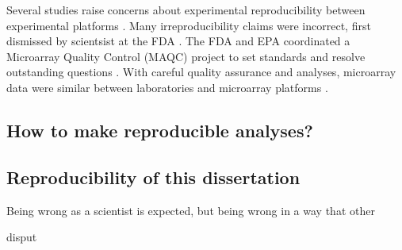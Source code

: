 Several studies 
raise concerns about experimental reproducibility between
experimental platforms \cite{Tan:2003be,Kuo:2002cl,
Mah:2004ia,Rogojina:2003te,Woo:2004wz,Li:2002cz,Kothapalli:2002gz}.
Many irreproducibility claims were incorrect, first
dismissed by scientsist at the FDA \cite{Shi:2005ik}.
The FDA and EPA coordinated a Microarray Quality Control (MAQC) project
to set standards and resolve outstanding questions 
\cite{Lesko:2004vi,Frueh:2006uy,Dix:2006ty,Shi:2004vh}.
With careful quality assurance and analyses,
microarray data were similar between 
laboratories \cite{Dobbin:2005wj,Irizarry:2005kb,Larkin:2005hb,
Ulrich:2004vw,Waring:2004vh,Weis:2005ut} and
microarray platforms \cite{Petersen:2005by,Yauk:2004fq,
Park:2004ux,Yuen:2002ha,Canales:2006ts,Shippy:2006uf,
Patterson:2006hi,Tong:2006cg,Guo:2006wi}.

\subsection{How to make reproducible analyses?}

\subsection{Reproducibility of this dissertation}

Being wrong as a scientist is expected, but being wrong in a way
that other


disput




